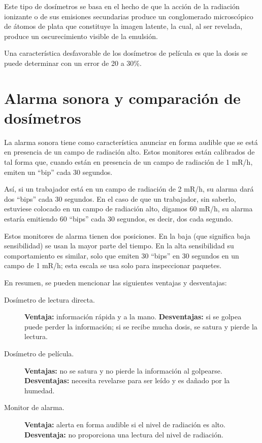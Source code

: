 Este tipo de dosímetros se basa en el hecho de que la acción de la radiación ionizante o de sus emisiones secundarias produce un conglomerado microscópico de átomos de plata que constituye la imagen latente, la cual, al ser revelada, produce un oscurecimiento visible de la emulsión.

Una característica desfavorable de los dosímetros de película es que la dosis se puede determinar con un error de 20 a 30\%.

\section{Alarma sonora y comparación de dosímetros}

La alarma sonora tiene como característica anunciar en forma audible que se está en presencia de un campo de radiación alto. Estos monitores están calibrados de tal forma que, cuando están en presencia de un campo de radiación de 1 mR/h, emiten un ``bip'' cada 30 segundos.

Así, si un trabajador está en un campo de radiación de 2 mR/h, su alarma dará dos ``bips'' cada 30 segundos. En el caso de que un trabajador, sin saberlo, estuviese colocado en un campo de radiación alto, digamos 60 mR/h, su alarma estaría emitiendo 60 ``bips'' cada 30 segundos, es decir, dos cada segundo.

Estos monitores de alarma tienen dos posiciones. En la baja (que significa baja sensibilidad) se usan la mayor parte del tiempo. En la alta sensibilidad su comportamiento es similar, solo que emiten 30 ``bips'' en 30 segundos en un campo de 1 mR/h; esta escala se usa solo para inspeccionar paquetes.

En resumen, se pueden mencionar las siguientes ventajas y desventajas:

\begin{description}
  \item[Dosímetro de lectura directa.] \textbf{Ventaja:} información rápida y a la mano. \textbf{Desventajas:} si se golpea puede perder la información; si se recibe mucha dosis, se satura y pierde la lectura.
  \item[Dosímetro de película.] \textbf{Ventajas:} no se satura y no pierde la información al golpearse. \textbf{Desventajas:} necesita revelarse para ser leído y es dañado por la humedad.
  \item[Monitor de alarma.] \textbf{Ventaja:} alerta en forma audible si el nivel de radiación es alto. \textbf{Desventaja:} no proporciona una lectura del nivel de radiación.
\end{description}

